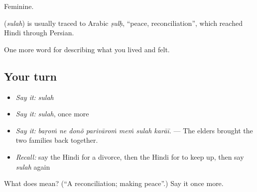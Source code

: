 Feminine.

\begin{cousinweb}
\textbf{} (\emph{sulah}) is usually traced to Arabic \emph{ṣulḥ}, \textquotedblleft{}peace, reconciliation\textquotedblright{}, which reached Hindi through Persian.
\end{cousinweb}

\begin{grammarlens}[title={What you've built}]
One more word for describing what you lived and felt.
\end{grammarlens}

\subsection*{Your turn}
\begin{itemize}
\raggedright
  \item \emph{Say it:} \emph{sulah}
  \item \emph{Say it:} \emph{sulah}, once more
  \item \emph{Say it:} \emph{baṛoṁ ne donõ parivāroṁ meṁ sulah karāī.} — The elders brought the two families back together.
  \item \emph{Recall:} say the Hindi for a divorce, then the Hindi for to keep up, then say \emph{sulah} again
\end{itemize}

\begin{tcolorbox}[breakable,colback=teal!4,colframe=teal!35!black,title={Before you move on}]
What does  mean? (\textquotedblleft{}A reconciliation; making peace\textquotedblright{}.) Say it once more.
\end{tcolorbox}
